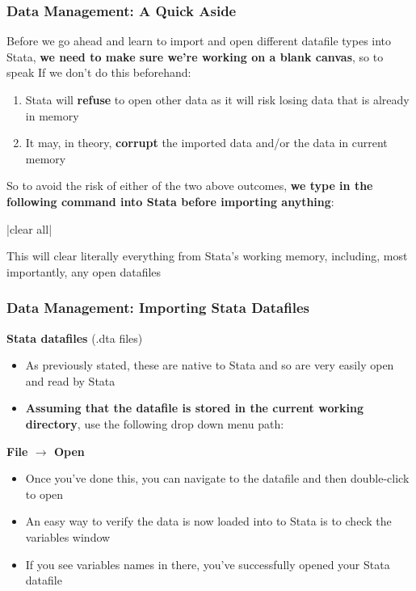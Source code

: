 \documentclass[10pt, compress]{beamer}
\begin{document}
\begin{frame}[fragile]
\frametitle{Data Management: A Quick Aside}
Before we go ahead and learn to import and open different datafile types into Stata, \textbf{we need to make sure we're working on a blank canvas}, so to speak
If we don't do this beforehand:
\begin{enumerate}
\item Stata will \textbf{refuse} to open other data as it will risk losing data that is already in memory
\item It may, in theory, \textbf{corrupt} the imported data and/or the data in current memory
\end{enumerate}
So to avoid the risk of either of the two above outcomes, \textbf{we type in the following command into Stata before importing anything}:
\begin{center}
|clear all|
\end{center}
This will \alert{clear literally everything from Stata's working memory}, including, most importantly, any open datafiles
\end{frame}

\begin{frame}[fragile]
\frametitle{Data Management: Importing Stata Datafiles}
\textbf{Stata datafiles} (.dta files)
\begin{itemize}
	\item As previously stated, these are native to Stata and so are very easily open and read by Stata
	\item \textbf{Assuming that the datafile is stored in the current working directory}, use the following drop down menu path:
\end{itemize}
\begin{center}
\textbf{File $\to$ Open}
\end{center}
\begin{itemize}
	\item Once you've done this, you can navigate to the datafile and then double-click to open
	\item An easy way to verify the data is now loaded into to Stata is to check the \alert{variables window}
	\item If you see variables names in there, \alert{you've successfully opened your Stata datafile}
\end{itemize}
\end{frame}
\end{document}
